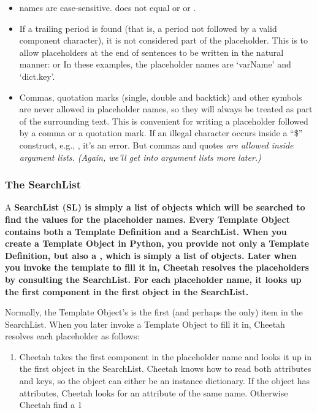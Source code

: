 \begin{itemize}
\item names are case-sensitive.  does not equal 
     or  or .     
     
\item If a trailing period is found (that is, a period not followed by a valid
     component character), it is not considered part of the placeholder.  This
     is to allow placeholders at the end of sentences to be written in the 
     natural manner:  or
       In these examples, the 
     placeholder names are `varName' and `dict.key'.

\item Commas, quotation marks (single, double and backtick) and other symbols
     are never allowed in placeholder names, so they will always be treated
     as part of the surrounding text.  This is convenient for writing a 
     placeholder followed by a comma or a quotation mark.  If an illegal
     character occurs inside a ``\${}'' construct, e.g., ,
     it's an error.  But commas and quotes \em{are} allowed inside argument
     lists.  (Again, we'll get into argument lists more later.)

\end{itemize}
     

\subsubsection{The SearchList}

A \bf{SearchList (SL)} is simply a list of objects which will be searched to
find the values for the placeholder names.  Every Template Object
contains both a Template Definition and a SearchList.  
When you create a Template Object in Python, you provide not only a
Template Definition, but also a , which is simply a list of
objects.  Later when you invoke the template to fill it in, Cheetah resolves
the placeholders by consulting the SearchList.  For each placeholder name, it
looks up the first component in the first object in the SearchList.

Normally, the Template Object's  is the
first (and perhaps the only) item in the SearchList.  
When you later invoke a Template
Object to fill it in, Cheetah resolves each placeholder as follows:


\begin{enumerate}

\item Cheetah takes the first component in the placeholder name and looks it up
     in the first object in the SearchList.  Cheetah knows how to read both
     attributes and keys, so the object can either be an instance
     dictionary.  If the object has attributes, Cheetah looks for an attribute
     of the same name.  Otherwise Cheetah
     find a 1

\end{enumerate}

